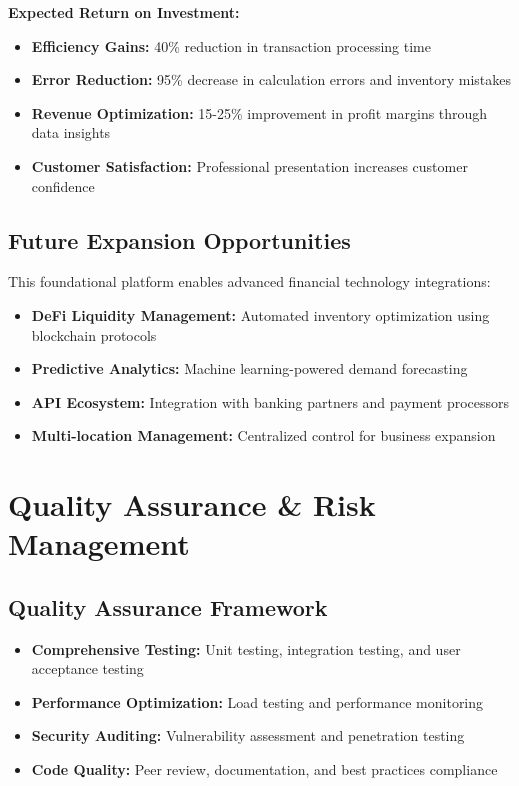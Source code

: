 \documentclass[11pt, letterpaper]{article}
\begin{document}
\begin{tcolorbox}[colback=techBlue!10, colframe=techBlue, title=\textbf{Project Investment: \$2,000 CAD}]
\textbf{Expected Return on Investment:}
\begin{itemize}[leftmargin=*]
    \item \textbf{Efficiency Gains:} 40\% reduction in transaction processing time
    \item \textbf{Error Reduction:} 95\% decrease in calculation errors and inventory mistakes
    \item \textbf{Revenue Optimization:} 15-25\% improvement in profit margins through data insights
    \item \textbf{Customer Satisfaction:} Professional presentation increases customer confidence
\end{itemize}
\end{tcolorbox}

\subsection{Future Expansion Opportunities}

This foundational platform enables advanced financial technology integrations:

\begin{itemize}[leftmargin=*]
    \item \textbf{DeFi Liquidity Management:} Automated inventory optimization using blockchain protocols
    \item \textbf{Predictive Analytics:} Machine learning-powered demand forecasting
    \item \textbf{API Ecosystem:} Integration with banking partners and payment processors
    \item \textbf{Multi-location Management:} Centralized control for business expansion
\end{itemize}

\section{Quality Assurance \& Risk Management}

\subsection{Quality Assurance Framework}

\begin{itemize}[leftmargin=*]
    \item \textbf{Comprehensive Testing:} Unit testing, integration testing, and user acceptance testing
    \item \textbf{Performance Optimization:} Load testing and performance monitoring
    \item \textbf{Security Auditing:} Vulnerability assessment and penetration testing
    \item \textbf{Code Quality:} Peer review, documentation, and best practices compliance
\end{itemize}
\end{document}
